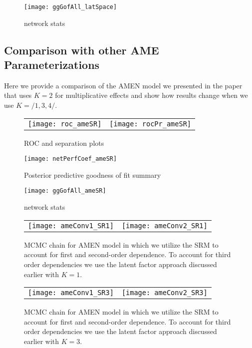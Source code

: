 \begin{figure}[ht]
	\centering
	\texttt{[image: ggGofAll\_latSpace]}
	\caption{network stats }
	\label{fig:gofAll_latSpace}
\end{figure}
\FloatBarrier
\newpage

\subsection{Comparison with other AME Parameterizations}

Here we provide a comparison of the AMEN model we presented in the paper that uses $K=2$ for multiplicative effects and show how results change when we use $K=/{1,3,4/}$. 



\begin{figure}[ht]
	\centering
	\begin{tabular}{cc}
	\texttt{[image: roc\_ameSR]} & 
	\texttt{[image: rocPr\_ameSR]}
	\end{tabular}
	\caption{ROC and separation plots}
	\label{fig:roc_latentSpace}
\end{figure}

\begin{figure}[ht]
	\centering
	\texttt{[image: netPerfCoef\_ameSR]}
	\caption{Posterior predictive goodness of fit summary}
	\label{fig:netPerfCoef_ameSR}
\end{figure}

\begin{figure}[ht]
	\centering
	\texttt{[image: ggGofAll\_ameSR]}
	\caption{network stats }
	\label{fig:gofAll_ameSR}
\end{figure}
\FloatBarrier

\newpage
\begin{figure}[ht]
	\centering
	\begin{tabular}{cc}
	\texttt{[image: ameConv1\_SR1]} &
	\texttt{[image: ameConv2\_SR1]}
	\end{tabular}
	\caption{MCMC chain for AMEN model in which we utilize the SRM to account for first and second-order dependence. To account for third order dependencies we use the latent factor approach discussed earlier with $K=1$.}
	\label{fig:ameConv}
\end{figure}

\begin{figure}[ht]
	\centering
	\begin{tabular}{cc}
	\texttt{[image: ameConv1\_SR3]} &
	\texttt{[image: ameConv2\_SR3]}
	\end{tabular}
	\caption{MCMC chain for AMEN model in which we utilize the SRM to account for first and second-order dependence. To account for third order dependencies we use the latent factor approach discussed earlier with $K=3$.}
	\label{fig:ameConv}
\end{figure}
\FloatBarrier

